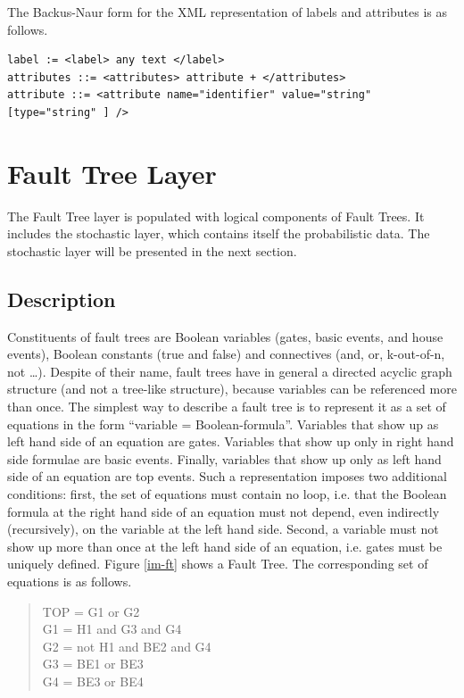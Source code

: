 \documentclass[11pt]{article}
\begin{document}
The Backus-Naur form for the XML representation of labels and attributes
is as follows.

\lstset{language=XML,label= ,caption= ,captionpos=b,numbers=none}
\begin{lstlisting}
label := <label> any text </label>
attributes ::= <attributes> attribute + </attributes>
attribute ::= <attribute name="identifier" value="string" [type="string" ] />
\end{lstlisting}

\section{Fault Tree Layer}
\label{sec:org5420222}

The Fault Tree layer is populated with logical components of Fault
Trees. It includes the stochastic layer, which contains itself the
probabilistic data. The stochastic layer will be presented in the next
section.

\subsection{Description}
\label{sec:orgd4a28b9}

Constituents of fault trees are Boolean variables (gates, basic events,
and house events), Boolean constants (true and false) and connectives
(and, or, k-out-of-n, not \ldots{}). Despite of their name, fault trees have
in general a directed acyclic graph structure (and not a tree-like
structure), because variables can be referenced more than once. The
simplest way to describe a fault tree is to represent it as a set of
equations in the form ``variable = Boolean-formula''. Variables that show
up as left hand side of an equation are gates. Variables that show up
only in right hand side formulae are basic events. Finally, variables
that show up only as left hand side of an equation are top events. Such
a representation imposes two additional conditions: first, the set of
equations must contain no loop, i.e. that the Boolean formula at the
right hand side of an equation must not depend, even indirectly
(recursively), on the variable at the left hand side. Second, a variable
must not show up more than once at the left hand side of an equation,
i.e. gates must be uniquely defined. Figure \ref{im-ft}  shows a Fault Tree.
The corresponding set of equations is as follows.


\begin{verse}
\vspace*{1em}
TOP = G1 or G2\\
\vspace*{1em}
G1 = H1 and G3 and G4\\
\vspace*{1em}
G2 = not H1 and BE2 and G4\\
\vspace*{1em}
G3 = BE1 or BE3\\
\vspace*{1em}
G4 = BE3 or BE4\\
\vspace*{1em}
\end{verse}
\end{document}
